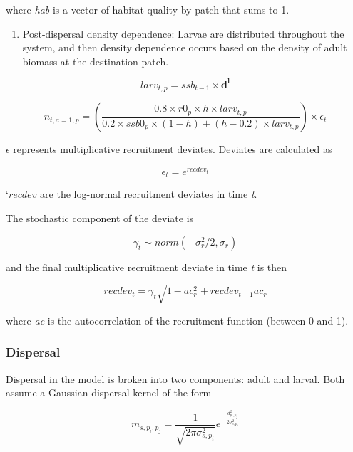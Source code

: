 \documentclass[]{article}
\providecommand{\tightlist}{%
  \setlength{\itemsep}{0pt}\setlength{\parskip}{0pt}}
\begin{document}
where \emph{hab} is a vector of habitat quality by patch that sums to 1.

\begin{enumerate}
\def\labelenumi{\arabic{enumi}.}
\setcounter{enumi}{2}
\tightlist
\item
  Post-dispersal density dependence: Larvae are distributed throughout the system, and then density dependence occurs based on the density of adult biomass at the destination patch.
\end{enumerate}

\begin{equation}
  larv_{t,p} = ssb_{t-1} \times\boldsymbol{d^l}
  \label{eq:larvmove}
\end{equation}

\begin{equation}
n_{t,a = 1,p} = \left(\frac{0.8{\times}r0_{p}\times{h}\times{larv_{t,p}}}{0.2\times{ssb0_p}\times(1 - h)+(h - 0.2)\times{larv_{t,p}}}\right) \times \epsilon_t
  \label{eq:dd3}
\end{equation}

\(\epsilon\) represents multiplicative recruitment deviates. Deviates are calculated as

\[\epsilon_t = e^{recdev_t}\]

`\(recdev\) are the log-normal recruitment deviates in time \emph{t}.

The stochastic component of the deviate is

\[\gamma_t \sim norm(-\sigma_r^2/2,\sigma_r)\]

and the final multiplicative recruitment deviate in time \emph{t} is then

\[recdev_t = \gamma_t\sqrt{1 - ac_r^2} + recdev_{t-1}ac_r \]

where \emph{ac} is the autocorrelation of the recruitment function (between 0 and 1).

\hypertarget{dispersal}{%
\subsubsection{Dispersal}\label{dispersal}}

Dispersal in the model is broken into two components: adult and larval. Both assume a Gaussian dispersal kernel of the form

\begin{equation}
m_{s,p_i,p_j}=\frac{1}{\sqrt{2\pi\sigma_{s,p_i}^2}}e^{-\frac{d_{p_i,p_j}^2}{2\sigma_{s,p_i}^2}}
  \label{eq:move}
\end{equation}
\end{document}

